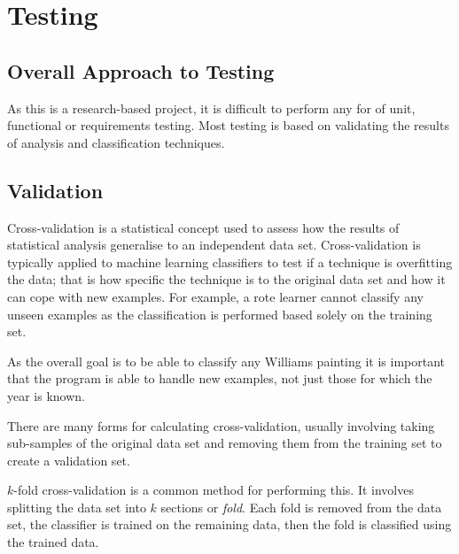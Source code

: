 \chapter{Testing}



\section{Overall Approach to Testing}
As this is a research-based project, it is difficult to perform any for of unit, functional or 
requirements testing. Most testing is based on validating the results of analysis and 
classification techniques.


\section{Validation}
Cross-validation is a statistical concept used to assess how the results of statistical analysis
generalise to an independent data set. Cross-validation is typically applied to machine learning
classifiers to test if a technique is overfitting the data; that is how specific the technique is
to the original data set and how it can cope with new examples. For example, a rote learner cannot
classify any unseen examples as the classification is performed based solely on the training set.

As the overall goal is to be able to classify any Williams painting it is important that the 
program is able to handle new examples, not just those for which the year is known.

There are many forms for calculating cross-validation, usually involving taking sub-samples of the
original data set and removing them from the training set to create a validation set.

$k$-fold cross-validation is a common method for performing this. It involves splitting the data
set into $k$ sections or \emph{fold}. Each fold is removed from the data set, the classifier is
trained on the remaining data, then the fold is classified using the trained data. 

